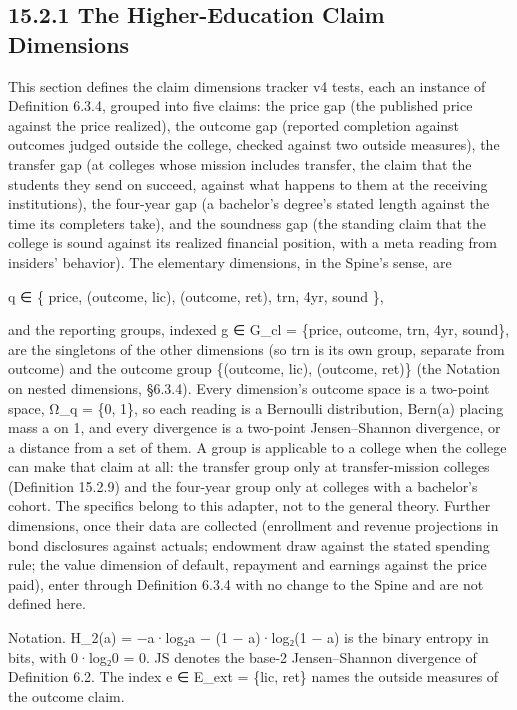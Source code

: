 \documentclass[
]{article}
\begin{document}
\hypertarget{the-higher-education-claim-dimensions}{%
\subsection{15.2.1 The Higher-Education Claim
Dimensions}\label{the-higher-education-claim-dimensions}}

This section defines the claim dimensions tracker v4 tests, each an
instance of Definition 6.3.4, grouped into five claims: the price gap
(the published price against the price realized), the outcome gap
(reported completion against outcomes judged outside the college,
checked against two outside measures), the transfer gap (at colleges
whose mission includes transfer, the claim that the students they send
on succeed, against what happens to them at the receiving institutions),
the four-year gap (a bachelor's degree's stated length against the time
its completers take), and the soundness gap (the standing claim that the
college is sound against its realized financial position, with a meta
reading from insiders' behavior). The elementary dimensions, in the
Spine's sense, are

q ∈ \{ price, (outcome, lic), (outcome, ret), trn, 4yr, sound \},

and the reporting groups, indexed g ∈ G\_cl = \{price, outcome, trn,
4yr, sound\}, are the singletons of the other dimensions (so trn is its
own group, separate from outcome) and the outcome group \{(outcome,
lic), (outcome, ret)\} (the Notation on nested dimensions, §6.3.4).
Every dimension's outcome space is a two-point space, Ω\_q = \{0, 1\},
so each reading is a Bernoulli distribution, Bern(a) placing mass a on
1, and every divergence is a two-point Jensen--Shannon divergence, or a
distance from a set of them. A group is applicable to a college when the
college can make that claim at all: the transfer group only at
transfer-mission colleges (Definition 15.2.9) and the four-year group
only at colleges with a bachelor's cohort. The specifics belong to this
adapter, not to the general theory. Further dimensions, once their data
are collected (enrollment and revenue projections in bond disclosures
against actuals; endowment draw against the stated spending rule; the
value dimension of default, repayment and earnings against the price
paid), enter through Definition 6.3.4 with no change to the Spine and
are not defined here.

Notation. H\_2(a) = −a·log₂a − (1 − a)·log₂(1 − a) is the binary entropy
in bits, with 0·log₂0 = 0. JS denotes the base-2 Jensen--Shannon
divergence of Definition 6.2. The index e ∈ E\_ext = \{lic, ret\} names
the outside measures of the outcome claim.
\end{document}
